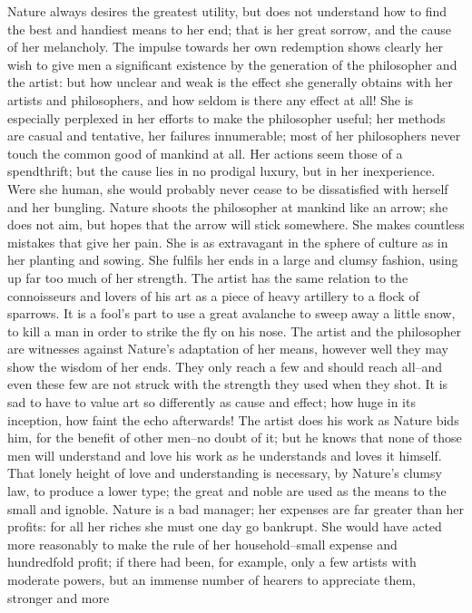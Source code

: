 Nature always desires the greatest utility, but does not understand
how to find the best and handiest means to her end; that is her great
sorrow, and the cause of her melancholy. The impulse towards her own
redemption shows clearly her wish to give men a significant existence
by the generation of the philosopher and the artist: but how unclear
and weak is the effect she generally obtains with her artists and
philosophers, and how seldom is there any effect at all! She is
especially perplexed in her efforts to make the philosopher useful;
her methods are casual and tentative, her failures innumerable; most
of her philosophers never touch the common good of mankind at all.
Her actions seem those of a spendthrift; but the cause lies in no
prodigal luxury, but in her inexperience. Were she human, she would
probably never cease to be dissatisfied with herself and her
bungling. Nature shoots the philosopher at mankind like an arrow; she
does not aim, but hopes that the arrow will stick somewhere. She
makes countless mistakes that give her pain. She is as extravagant in
the sphere of culture as in her planting and sowing. She fulfils her
ends in a large and clumsy fashion, using up far too much of her
strength. The artist has the same relation to the connoisseurs and
lovers of his art as a piece of heavy artillery to a flock of
sparrows. It is a fool's part to use a great avalanche to sweep away
a little snow, to kill a man in order to strike the fly on his nose.
The artist and the philosopher are witnesses against Nature's
adaptation of her means, however well they may show the wisdom of her
ends. They only reach a few and should reach all--and even these few
are not struck with the strength they used when they shot. It is sad
to have to value art so differently as cause and effect; how huge in
its inception, how faint the echo afterwards! The artist does his
work as Nature bids him, for the benefit of other men--no doubt of
it; but he knows that none of those men will understand and love his
work as he understands and loves it himself. That lonely height of
love and understanding is necessary, by Nature's clumsy law, to
produce a lower type; the great and noble are used as the means to
the small and ignoble. Nature is a bad manager; her expenses are far
greater than her profits: for all her riches she must one day go
bankrupt. She would have acted more reasonably to make the rule of
her household--small expense and hundredfold profit; if there had
been, for example, only a few artists with moderate powers, but an
immense number of hearers to appreciate them, stronger and more

